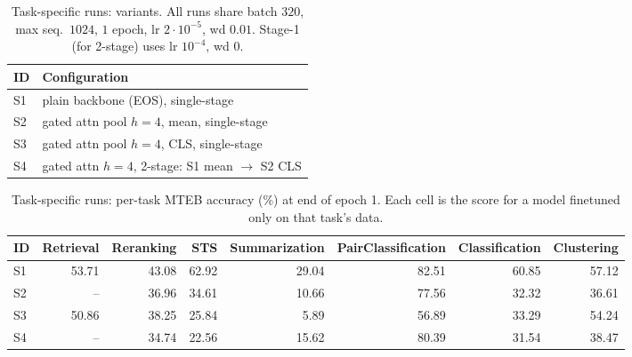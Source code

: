 
\begin{table}[ht]
\centering
\small
\setlength{\tabcolsep}{4pt}
\caption{Task-specific runs: variants. All runs share batch $320$, max seq.\ $1024$, $1$ epoch, lr $2{\cdot}10^{-5}$, wd $0.01$. Stage-1 (for 2-stage) uses lr $10^{-4}$, wd $0$.}
\label{tab:ts-hparams}
\begin{tabular}{ll}
\toprule
ID & Configuration \\
\midrule
S1 & plain backbone (EOS), single-stage \\
S2 & gated attn pool $h{=}4$, mean, single-stage \\
S3 & gated attn pool $h{=}4$, CLS, single-stage \\
S4 & gated attn $h{=}4$, 2-stage: S1 mean $\to$ S2 CLS \\
\bottomrule
\end{tabular}
\end{table}

\begin{table}[ht]
\centering
\small
\setlength{\tabcolsep}{4pt}
\caption{Task-specific runs: per-task MTEB accuracy (\%) at end of epoch 1. Each cell is the score for a model finetuned only on that task's data.}
\label{tab:ts-perf}
\begin{tabular}{lrrrrrrr}
\toprule
ID & Retrieval & Reranking & STS & Summarization & PairClassification & Classification & Clustering \\
\midrule
S1 & 53.71 & 43.08 & 62.92 & 29.04 & 82.51 & 60.85 & 57.12 \\
S2 & -- & 36.96 & 34.61 & 10.66 & 77.56 & 32.32 & 36.61 \\
S3 & 50.86 & 38.25 & 25.84 & 5.89 & 56.89 & 33.29 & 54.24 \\
S4 & -- & 34.74 & 22.56 & 15.62 & 80.39 & 31.54 & 38.47 \\
\bottomrule
\end{tabular}
\end{table}

